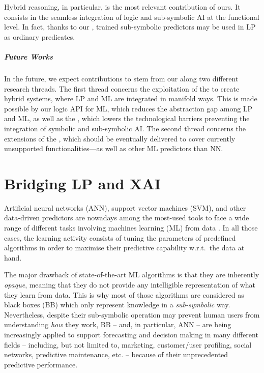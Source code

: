 \documentclass[12pt,a4paper,openright,twoside]{book}
\begin{document}
Hybrid reasoning, in particular, is the most relevant contribution of ours.
%
It consists in the seamless integration of logic and sub-symbolic AI at the functional level.
%
In fact, thanks to our \mllib{}, trained sub-symbolic predictors may be used in LP as ordinary predicates.

\paragraph{Future Works}

In the future, we expect contributions to stem from our \mllib{} along two different research threads.
%
The first thread concerns the exploitation of the \mllib{} to create hybrid systems, where LP and ML are integrated in manifold ways.
%
This is made possible by our logic API for ML, which reduces the abstraction gap among LP and ML, as well as the \mllib, which lowers the technological barriers preventing the integration of symbolic and sub-symbolic AI.
%
The second thread concerns the extensions of the \mllib{}, which should be eventually delivered to cover currently unsupported functionalities---as well as other ML predictors than NN.

\chapter{Bridging LP and XAI}


Artificial neural networks (ANN), support vector machines (SVM), and other data-driven predictors are nowadays among the most-used tools to face a wide range of different tasks involving machines learning (ML) from data \cite{rocha2012far}.
%
In all those cases, the learning activity consists of tuning the parameters of predefined algorithms in order to maximise their predictive capability w.r.t.\ the data at hand.

The major drawback of state-of-the-art ML algorithms is that they are inherently \emph{opaque}, meaning that they do not provide any intelligible representation of what they learn from data.
%
This is why most of those algorithms are considered as black boxes (BB) which only represent knowledge in a \emph{sub-symbolic} way.
%
Nevertheless, despite their sub-symbolic operation may prevent human users from understanding \emph{how} they work, BB -- and, in particular, ANN -- are being increasingly applied to support forecasting and decision making in many different fields -- including, but not limited to, marketing, customer/user profiling, social networks, predictive maintenance, etc. -- because of their unprecedented predictive performance.
\end{document}
